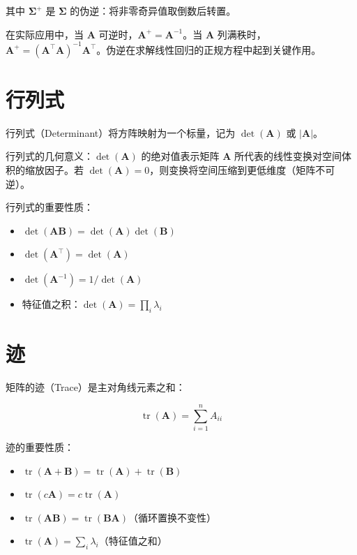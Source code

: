 其中 $\boldsymbol{\Sigma}^{+}$ 是 $\boldsymbol{\Sigma}$ 的伪逆：将非零奇异值取倒数后转置。

在实际应用中，当 $\mathbf{A}$ 可逆时，$\mathbf{A}^{+}=\mathbf{A}^{-1}$。当 $\mathbf{A}$ 列满秩时，$\mathbf{A}^{+}=(\mathbf{A}^{\top}\mathbf{A})^{-1}\mathbf{A}^{\top}$。伪逆在求解线性回归的正规方程中起到关键作用。

\section{行列式}

行列式（Determinant）将方阵映射为一个标量，记为 $\det(\mathbf{A})$ 或 $|\mathbf{A}|$。

行列式的几何意义：$\det(\mathbf{A})$ 的绝对值表示矩阵 $\mathbf{A}$ 所代表的线性变换对空间体积的缩放因子。若 $\det(\mathbf{A})=0$，则变换将空间压缩到更低维度（矩阵不可逆）。

行列式的重要性质：
\begin{itemize}
    \item $\det(\mathbf{A}\mathbf{B})=\det(\mathbf{A})\det(\mathbf{B})$
    \item $\det(\mathbf{A}^{\top})=\det(\mathbf{A})$
    \item $\det(\mathbf{A}^{-1})=1/\det(\mathbf{A})$
    \item 特征值之积：$\det(\mathbf{A})=\prod_{i}\lambda_i$
\end{itemize}

\section{迹}

矩阵的迹（Trace）是主对角线元素之和：

\[
\operatorname{tr}(\mathbf{A}) = \sum_{i=1}^{n} A_{ii}
\]

迹的重要性质：
\begin{itemize}
    \item $\operatorname{tr}(\mathbf{A}+\mathbf{B})=\operatorname{tr}(\mathbf{A})+\operatorname{tr}(\mathbf{B})$
    \item $\operatorname{tr}(c\mathbf{A})=c\operatorname{tr}(\mathbf{A})$
    \item $\operatorname{tr}(\mathbf{A}\mathbf{B})=\operatorname{tr}(\mathbf{B}\mathbf{A})$（循环置换不变性）
    \item $\operatorname{tr}(\mathbf{A})=\sum_i \lambda_i$（特征值之和）
\end{itemize}

